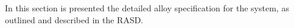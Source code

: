 In this section is presented the detailed alloy specification for the system, as outlined and described in the RASD.
\vspace{2cm}

\newpage